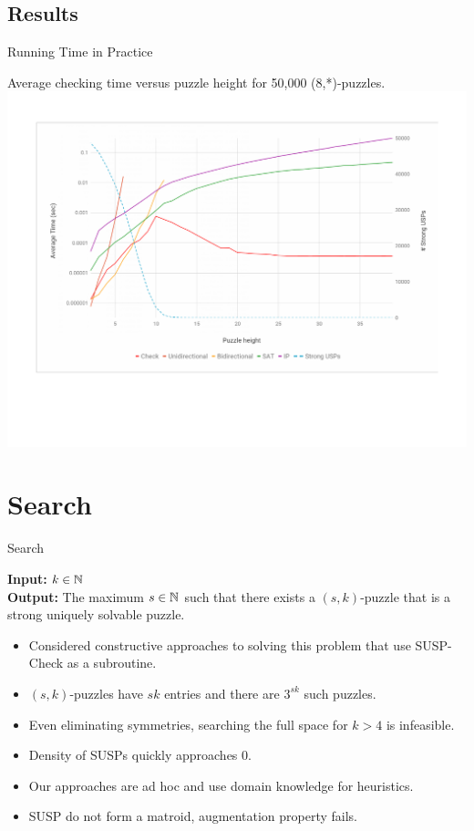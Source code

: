 \documentclass[t,10pt,
mathserif,xcolor=dvipsnames]{beamer}
\begin{document}
\subsection{Results}

\begin{myframe}{Running Time in Practice}

  Average checking time versus puzzle height for 50,000 (8,*)-puzzles.
  \hspace*{-8ex}\includegraphics[width=1.25\linewidth, trim={.5in 0.75in 0 1in}, clip]{figs/plot.pdf}
 
\end{myframe}


\section{Search}


\begin{myframe}{Search}

  \begin{problem}
    \textbf{Input:} $k \in \mathbb{N}$ \\[1ex] \textbf{Output:} The maximum
    $s\in \mathbb{N}$ such that there exists a $(s,k)$-puzzle that is a strong
    uniquely solvable puzzle.
  \end{problem}

  \begin{itemize}
  \item Considered constructive approaches to solving this
    problem that use SUSP-Check as a subroutine.
  \item $(s,k)$-puzzles have $sk$ entries and there are $3^{sk}$ such puzzles.
  \item Even eliminating symmetries, searching the full space for $k >
    4$ is infeasible.
  \item Density of SUSPs quickly approaches 0.
  \item Our approaches are ad hoc and use domain knowledge for heuristics.
  \item SUSP do not form a matroid, augmentation property fails.
  \end{itemize}

  
\end{myframe}
\end{document}
